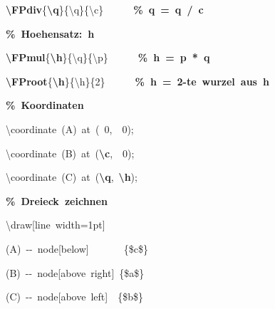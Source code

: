 {{\rule[-0.5ex]{0pt}{2.5ex}\hspace*{1.0em}\textcolor{R}{\textbf{\textbackslash{}FPdiv}}\{\textcolor{B}{\textbf{\textbackslash{}q}}\}\{\textbackslash{}q\}\{\textbackslash{}c\}~~~~~~\textcolor{G}{\textbf{\%~q~=~q~/~c}}\\
\rule[-0.5ex]{0pt}{2.5ex}\hspace*{1.0em}\textcolor{G}{\textbf{\%~Hoehensatz:~h}}\\
\rule[-0.5ex]{0pt}{2.5ex}\hspace*{1.0em}\textcolor{R}{\textbf{\textbackslash{}FPmul}}\{\textcolor{B}{\textbf{\textbackslash{}h}}\}\{\textbackslash{}q\}\{\textbackslash{}p\}~~~~~~\textcolor{G}{\textbf{\%~h~=~p~*~q}}\\
\rule[-0.5ex]{0pt}{2.5ex}\hspace*{1.0em}\textcolor{R}{\textbf{\textbackslash{}FProot}}\{\textcolor{B}{\textbf{\textbackslash{}h}}\}\{\textbackslash{}h\}\{2\}~~~~~~\textcolor{G}{\textbf{\%~h~=~2{-}te~wurzel~aus~h}}\\
\rule[-0.5ex]{0pt}{2.5ex}\hspace*{1.0em}\textcolor{G}{\textbf{\%~Koordinaten}}\\
\rule[-0.5ex]{0pt}{2.5ex}\hspace*{1.0em}\textbackslash{}coordinate~(A)~at~(~0,~~0);\\
\rule[-0.5ex]{0pt}{2.5ex}\hspace*{1.0em}\textbackslash{}coordinate~(B)~at~(\textcolor{B}{\textbf{\textbackslash{}c}},~~0);\\
\rule[-0.5ex]{0pt}{2.5ex}\hspace*{1.0em}\textbackslash{}coordinate~(C)~at~(\textcolor{B}{\textbf{\textbackslash{}q}},~\textcolor{B}{\textbf{\textbackslash{}h}});\\
\rule[-0.5ex]{0pt}{2.5ex}\hspace*{1.0em}\textcolor{G}{\textbf{\%~Dreieck~zeichnen}}\\
\rule[-0.5ex]{0pt}{2.5ex}\hspace*{1.0em}\textbackslash{}draw[line~width=1pt]\\
\rule[-0.5ex]{0pt}{2.5ex}\hspace*{3.5em}(A)~{-}{-}~node[below]~~~~~~~\{\$c\$\}\\
\rule[-0.5ex]{0pt}{2.5ex}\hspace*{3.5em}(B)~{-}{-}~node[above~right]~\{\$a\$\}\\
\rule[-0.5ex]{0pt}{2.5ex}\hspace*{3.5em}(C)~{-}{-}~node[above~left]~~\{\$b\$\}\\
}}
